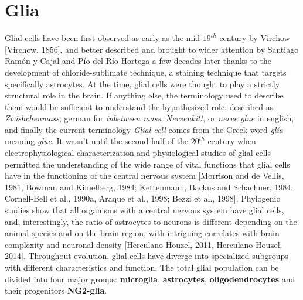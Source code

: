 \section{Glia}
\label{chap1:sec2:glia}
Glial cells have been first observed as early as the mid $19^{th}$ century by Virchow [Virchow, 1856], and better described and brought to wider attention by Santiago Ramón y Cajal and Pío del Río Hortega a few decades later thanks to the development of chloride-sublimate technique, a staining technique that targets specifically astrocytes.
At the time, glial cells were thought to play a strictly structural role in the brain.
If anything else, the terminology used to describe them would be sufficient to understand the hypothesized role: described as \textit{Zwishchenmass}, german for \textit{inbetween mass}, \textit{Nervenkitt}, or \textit{nerve glue} in english, and finally the current terminology \textit{Glial cell} comes from the Greek word \textit{gl\'ia} meaning \textit{glue}.
It wasn't until the second half of the $20^{th}$ century when electrophysiological characterization and physiological studies of glial cells permitted the understanding of the wide range of vital functions that glial cells have in the functioning of the central nervous system [Morrison and de Vellis, 1981, Bowman and Kimelberg, 1984; Kettenmann, Backus and Schachner, 1984, Cornell-Bell et al., 1990a, Araque et al., 1998; Bezzi et al., 1998]. 
Phylogenic studies show that all organisms with a central nervous system have glial cells, and, interestingly, the ratio of astrocytes-to-neurons is different depending on the animal species and on the brain region, with intriguing correlates with brain complexity and neuronal density [Herculano-Houzel, 2011, Herculano-Houzel, 2014].   
Throughout evolution, glial cells have diverge into specialized subgroups with different characteristics and function. 
The total glial population can be divided into four major groups: \textbf{microglia}, \textbf{astrocytes}, \textbf{oligodendrocytes} and their progenitors \textbf{NG2-glia}. 


